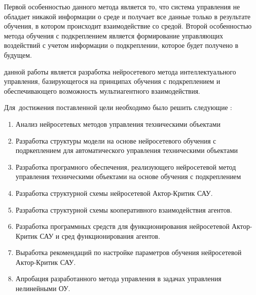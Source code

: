 Первой особенностью данного метода является то, что система управления не обладает никакой информации о среде и получает все данные только в результате обучения, в котором происходит взаимодействие со средой. Второй особенностью метода обучения с подкреплением является формирование управляющих воздействий с учетом информации о подкреплении, которое будет получено в будущем.



{\aim} данной работы является разработка нейросетевого метода интеллектуального управления, базирующегося на принципах обучения с подкреплением и обеспечивающего возможность мультиагентного взаимодействия.

Для~достижения поставленной цели необходимо было решить следующие {\tasks}:
\begin{enumerate}
	\item Анализ нейросетевых методов управления техническими объектами
	\item Разработка структуры модели на основе нейросетевого обучения с подркеплением для автоматического управления техническими объектами
	\item Разработка програмного обеспечения, реализующего нейросетевой метод управления техническими объектами на основе обучения с подкреплением

  \item Разработка структурной схемы нейросетевой Актор-Критик САУ.
  \item Разработка структурной схемы кооперативного взаимодействия агентов.
  \item Разработка программных средств для функционирования нейросетевой Актор-Критик САУ и сред функционирования агентов.
  \item Выработка рекомендаций по настройке параметров обучения нейросетевой Актор-Критик САУ.
  \item Апробация разработанного метода управления в задачах управления нелинейными ОУ.
\end{enumerate}



